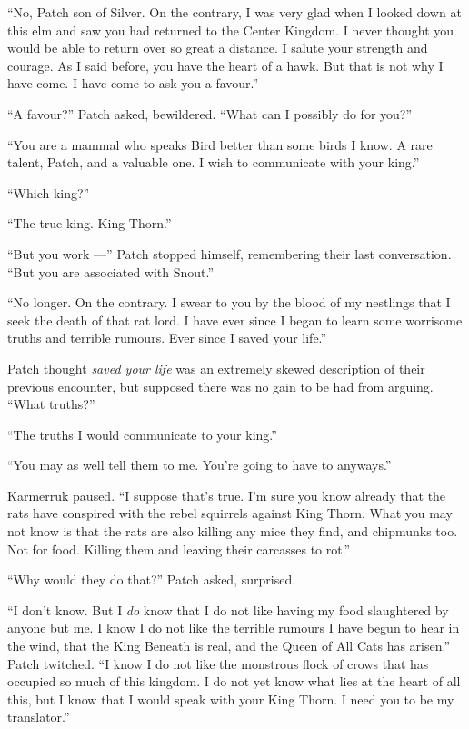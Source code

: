 \documentclass[ebook,oneside,openany,17pt]{memoir}
\newenvironment{tolerant}[1]{%
  \par\tolerance=#1\relax
}{%
  \par
}
\begin{document}
“No, Patch son of Silver. On the contrary, I was very glad when I
looked down at this elm and saw you had returned to the Center
Kingdom. I never thought you would be able to return over so great a
distance. I salute your strength and courage. As I said before, you
have the heart of a hawk. But that is not why I have come. I have come
to ask you a favour.”

“A favour?” Patch asked, bewildered. “What can I possibly do for you?”

“You are a mammal who speaks Bird better than some birds I know. A
rare talent, Patch, and a valuable one. I wish to communicate with
your king.”

“Which king?”

“The true king. King Thorn.”

“But you work —” Patch stopped himself, remembering their last
conversation. “But you are associated with Snout.”

“No longer. On the contrary. I swear to you by the blood of my
nestlings that I seek the death of that rat lord. I have ever since I
began to learn some worrisome truths and terrible rumours. Ever since
I saved your life.”

Patch thought \emph{saved your life} was an extremely skewed
description of their previous encounter, but supposed there was no
gain to be had from arguing. “What truths?”

“The truths I would communicate to your king.”

“You may as well tell them to me. You’re going to have to anyways.”

Karmerruk paused. “I suppose that’s true. I’m sure you know already
that the rats have conspired with the rebel squirrels against King
Thorn. What you may not know is that the rats are also killing any
mice they find, and chipmunks too. Not for food. Killing them and
leaving their carcasses to rot.”

\begin{tolerant}{2000}
“Why would they do that?” Patch asked, surprised.
\end{tolerant}

“I don’t know. But I \emph{do} know that I do not like having my
food slaughtered by anyone but me. I know I do not like the terrible
rumours I have begun to hear in the wind, that the King Beneath is
real, and the Queen of All Cats has arisen.” Patch twitched. “I know I
do not like the monstrous flock of crows that has occupied so much of
this kingdom. I do not yet know what lies at the heart of all this,
but I know that I would speak with your King Thorn. I need you to be
my translator.”
\end{document}
